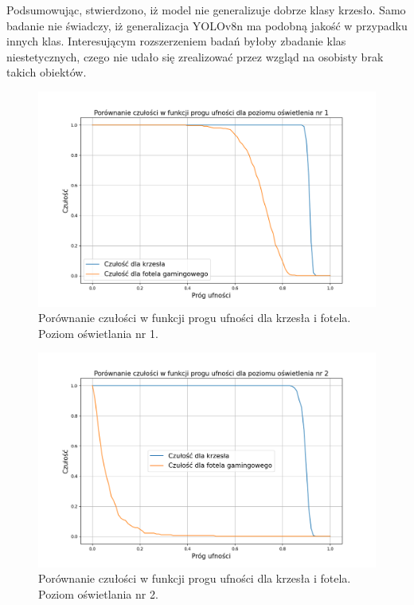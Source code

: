 Podsumowując, stwierdzono, iż model nie generalizuje dobrze klasy krzesło. Samo badanie nie świadczy, iż generalizacja YOLOv8n ma podobną jakość w przypadku innych klas. Interesującym rozszerzeniem badań byłoby zbadanie klas niestetycznych, czego nie udało się zrealizować przez wzgląd na osobisty brak takich obiektów. 

\begin{figure}[H]
    \centering
    \includegraphics[width=\linewidth]{r_test_dokładności/chair_charts/1.png}
    \caption{Porównanie czułości w funkcji progu ufności dla krzesła i fotela. Poziom oświetlania nr 1.}
    \label{fig:chair-game-1}
\end{figure}

\begin{figure}[H]
    \centering
    \includegraphics[width=\linewidth]{r_test_dokładności/chair_charts/2.png}
    \caption{Porównanie czułości w funkcji progu ufności dla krzesła i fotela. Poziom oświetlania nr 2.}
    \label{fig:chair-game-2}
\end{figure}

